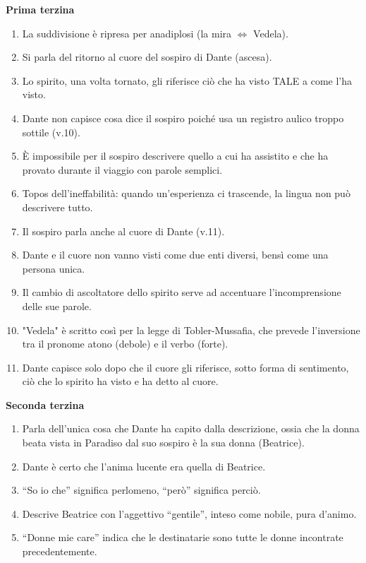 \documentclass{article}
\begin{document}
\textbf{Prima terzina}
\begin{enumerate}
    \item La suddivisione è ripresa per anadiplosi (la mira $\Longleftrightarrow$ Vedela).
    \item Si parla del ritorno al cuore del sospiro di Dante (ascesa).
    \item Lo spirito, una volta tornato, gli riferisce ciò che ha visto TALE a come l'ha visto.
    \item Dante non capisce cosa dice il sospiro poiché usa un registro aulico troppo sottile (v.10).
    \item È impossibile per il sospiro descrivere quello a cui ha assistito e che ha provato durante il viaggio con parole semplici.
    \item Topos dell'ineffabilità: quando un'esperienza ci trascende, la lingua non può descrivere tutto.
    \item Il sospiro parla anche al cuore di Dante (v.11).
    \item Dante e il cuore non vanno visti come due enti diversi, bensì come una persona unica.
    \item Il cambio di ascoltatore dello spirito serve ad accentuare l'incomprensione delle sue parole.
    \item "Vedela" è scritto così per la legge di Tobler-Mussafia, che prevede l'inversione tra il pronome atono (debole) e il verbo (forte).
    \item Dante capisce solo dopo che il cuore gli riferisce, sotto forma di sentimento, ciò che lo spirito ha visto e ha detto al cuore.
\end{enumerate}

\textbf{Seconda terzina}
\begin{enumerate}
    \item Parla dell'unica cosa che Dante ha capito dalla descrizione, ossia che la donna beata vista in Paradiso dal suo sospiro è la sua donna (Beatrice).
    \item Dante è certo che l'anima lucente era quella di Beatrice.
    \item ``So io che'' significa perlomeno, ``però'' significa perciò.
    \item Descrive Beatrice con l'aggettivo ``gentile'', inteso come nobile, pura d'animo.
    \item ``Donne mie care'' indica che le destinatarie sono tutte le donne incontrate precedentemente.
\end{enumerate}
\end{document}
